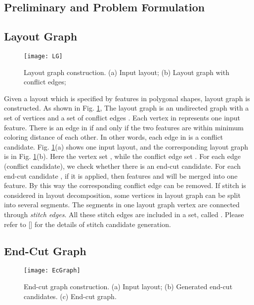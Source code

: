 \documentclass[12pt]{spieman}
\theoremstyle{plain}
\begin{document}
\begin{spacing}{1}
\section{Preliminary and Problem Formulation}
\label{sec:tplec_prelim}


\subsection{Layout Graph}

\begin{figure}[htb]
  \centering
  \texttt{[image: LG]}
  \caption{Layout graph construction.
  (a) Input layout;
  (b) Layout graph with conflict edges;
  }
  \label{fig:tplec_lg}
\end{figure}

Given a layout which is specified by features in polygonal shapes, layout graph \cite{TPL_ICCAD2011_Yu} is constructed.
As shown in Fig. \ref{fig:tplec_lg},
The layout graph is an undirected graph with a set of vertices  and a set of conflict edges .
Each vertex in  represents one input feature.
There is an edge in  if and only if the two features are within minimum coloring distance  of each other.
In other words, each edge in  is a conflict candidate.
Fig. \ref{fig:tplec_lg}(a) shows one input layout, and the corresponding layout graph is in Fig. \ref{fig:tplec_lg}(b).
Here the vertex set ,
while the conflict edge set .
For each edge (conflict candidate), we check whether there is an end-cut candidate.
For each end-cut candidate , if it is applied, then features  and  will be merged into one feature.
By this way the corresponding conflict edge can be removed.
If stitch is considered in layout decomposition, some vertices in layout graph can be split into several segments.
The segments in one layout graph vertex are connected through \textit{stitch edges}.
All these stitch edges are included in a set, called .
Please refer to [] for the details of stitch candidate generation.


\subsection{End-Cut Graph}
\label{sec:ec_graph}

\begin{figure}[htb]
  \centering
  \texttt{[image: EcGraph]}
  \caption{End-cut graph construction.
  (a) Input layout;
  (b) Generated end-cut candidates.
  (c) End-cut graph.
  }
  \label{fig:tplec_ecgraph}
\end{figure}


\end{spacing}
\end{document}
